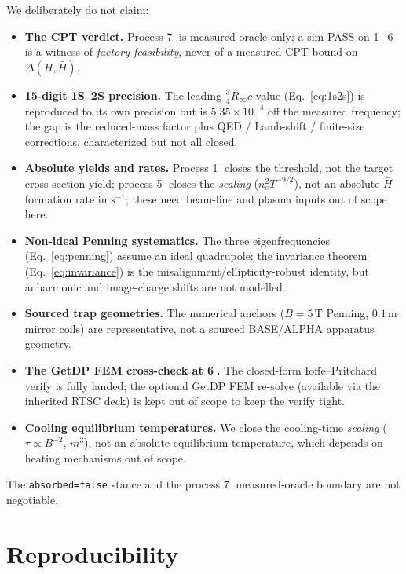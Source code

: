\documentclass[11pt,a4paper]{article}
\begin{document}
We deliberately do not claim:
\begin{itemize}\itemsep0.2em
\item \textbf{The CPT verdict.} Process \textcircled{\scriptsize 7} is
measured-oracle only; a sim-PASS on
\textcircled{\scriptsize 1}--\textcircled{\scriptsize 6} is a witness of
\emph{factory feasibility}, never of a measured CPT bound on $\Delta(H,\bar H)$.
\item \textbf{15-digit 1S--2S precision.} The leading
$\tfrac34 R_\infty c$ value (Eq.~\eqref{eq:1s2s}) is reproduced to its own
precision but is $5.35\!\times\!10^{-4}$ off the measured frequency; the gap
is the reduced-mass factor plus QED / Lamb-shift / finite-size corrections,
characterized but not all closed.
\item \textbf{Absolute yields and rates.} Process
\textcircled{\scriptsize 1} closes the threshold, not the target
cross-section yield; process \textcircled{\scriptsize 5} closes the
\emph{scaling} ($n_e^2 T^{-9/2}$), not an absolute $\bar H$ formation rate in
$\mathrm{s}^{-1}$; these need beam-line and plasma inputs out of scope here.
\item \textbf{Non-ideal Penning systematics.} The three eigenfrequencies
(Eq.~\eqref{eq:penning}) assume an ideal quadrupole; the invariance theorem
(Eq.~\eqref{eq:invariance}) is the misalignment/ellipticity-robust identity,
but anharmonic and image-charge shifts are not modelled.
\item \textbf{Sourced trap geometries.} The numerical anchors
($B=5$\,T Penning, $0.1$\,m mirror coils) are representative, not a sourced
BASE/ALPHA apparatus geometry.
\item \textbf{The GetDP FEM cross-check at \textcircled{\scriptsize 6}.} The
closed-form Ioffe--Pritchard verify is fully landed; the optional GetDP FEM
re-solve (available via the inherited RTSC deck) is kept out of scope to keep
the verify tight.
\item \textbf{Cooling equilibrium temperatures.} We close the cooling-time
\emph{scaling} ($\tau\!\propto\!B^{-2}$, $m^3$), not an absolute equilibrium
temperature, which depends on heating mechanisms out of scope.
\end{itemize}

\noindent
The \texttt{absorbed=false} stance and the process
\textcircled{\scriptsize 7} measured-oracle boundary are not negotiable.

\section{Reproducibility}
\label{sec:repro}
\end{document}
